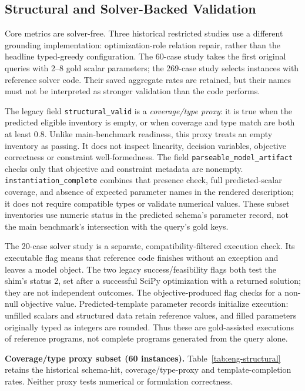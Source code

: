 \subsection{Structural and Solver-Backed Validation}
\label{app:restricted-details}\label{subsec:exp_engineering}

Core metrics are solver-free. Three historical restricted studies use a different grounding implementation: optimization-role relation repair, rather than the headline typed-greedy configuration. The 60-case study takes the first original queries with 2--8 gold scalar parameters; the 269-case study selects instances with reference solver code. Their saved aggregate rates are retained, but their names must not be interpreted as stronger validation than the code performs.

The legacy field \texttt{structural\_valid} is a \emph{coverage/type proxy}: it is true when the predicted eligible inventory is empty, or when coverage and type match are both at least 0.8. Unlike main-benchmark readiness, this proxy treats an empty inventory as passing. It does not inspect linearity, decision variables, objective correctness or constraint well-formedness. The field \texttt{parseable\_model\_artifact} checks only that objective and constraint metadata are nonempty. \texttt{instantiation\_complete} combines that presence check, full predicted-scalar coverage, and absence of expected parameter names in the rendered description; it does not require compatible types or validate numerical values. These subset inventories use numeric status in the predicted schema's parameter record, not the main benchmark's intersection with the query's gold keys.

The 20-case solver study is a separate, compatibility-filtered execution check. Its executable flag means that reference code finishes without an exception and leaves a model object. The two legacy success/feasibility flags both test the shim's status 2, set after a successful SciPy optimization with a returned solution; they are not independent outcomes. The objective-produced flag checks for a non-null objective value. Predicted-template parameter records initialize execution: unfilled scalars and structured data retain reference values, and filled parameters originally typed as integers are rounded. Thus these are gold-assisted executions of reference programs, not complete programs generated from the query alone.

\medskip\noindent\textbf{Coverage/type proxy subset (60 instances).}
Table~\ref{tab:eng-structural} retains the historical schema-hit, coverage/type-proxy and template-completion rates. Neither proxy tests numerical or formulation correctness.



